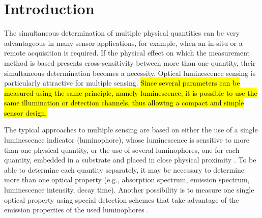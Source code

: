 \documentclass[sensors,article,submit,moreauthors,pdftex,10pt,a4paper]{Definitions/mdpi}
\begin{document}


\section{Introduction}
\label{Introduction}

The simultaneous determination of multiple physical quantities can be very advantageous in many sensor applications, for example, when an in-situ or a remote acquisition is required. 
If the physical effect on which the measurement method is based presents cross-sensitivity between more than one quantity, their simultaneous determination becomes a necessity.
Optical luminescence sensing is particularly attractive for multiple sensing. 
\hl{Since several parameters can be measured using the same principle, namely luminescence, it is possible to use the same illumination or detection channels, thus allowing a compact and simple sensor design.}

The typical approaches to multiple sensing are based on either the use of a single luminescence indicator (luminophore), whose luminescence is sensitive to more than one physical quantity, or the use of several luminophores, one for each quantity, embedded in a substrate and placed in close physical proximity \cite{Stich2010,Borisov2011novel,Kameya2014,Wang2014,Santoro2016,Biring2019, wolfbeis1991feasibility, zieger2020tadf, ohira2009fiber}. To be able to determine each quantity separately, it may be necessary to determine more than one optical property (e.g., absorption spectrum, emission spectrum, luminescence intensity, decay time). Another possibility is to measure one single optical property using special detection schemes that take advantage of the emission properties of the used luminophores \cite{Wang2014,Biring2019,Collier2013,Stehning2004,Jorge2008,Moore2006}. 
\end{document}
